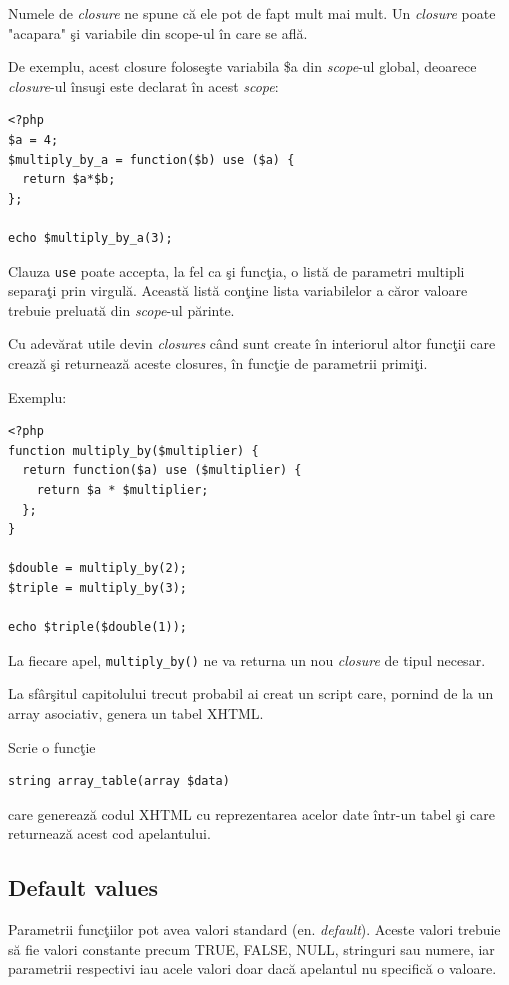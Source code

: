 Numele de \textit{closure} ne spune că ele pot de fapt mult mai mult.
Un \textit{closure} poate "acapara" şi variabile din scope-ul în care se află.

De exemplu, acest closure foloseşte variabila \$a din \textit{scope}-ul global,
deoarece \textit{closure}-ul însuşi este declarat în acest \textit{scope}:
\begin{lstlisting}
<?php
$a = 4;
$multiply_by_a = function($b) use ($a) {
  return $a*$b;
};

echo $multiply_by_a(3);
\end{lstlisting}
Clauza \texttt{use} poate accepta,
la fel ca şi funcţia, o listă de parametri multipli
separaţi prin virgulă. Această listă conţine lista variabilelor
a căror valoare trebuie preluată din \textit{scope}-ul părinte.

Cu adevărat utile devin \textit{closures} când sunt 
create în interiorul altor funcţii care crează şi
returnează aceste closures, în funcţie de parametrii primiţi.

Exemplu:
\begin{lstlisting}
<?php
function multiply_by($multiplier) {
  return function($a) use ($multiplier) {
	return $a * $multiplier;
  };
}

$double = multiply_by(2);
$triple = multiply_by(3);

echo $triple($double(1));
\end{lstlisting}
La fiecare apel, \texttt{multiply\_by()} ne va returna
un nou \textit{closure} de tipul necesar.

\begin{Exercise}[title={Afişarea unui array bidimensional}]
La sfârşitul capitolului trecut probabil ai creat un script
care, pornind de la un array asociativ, genera un tabel XHTML.

Scrie o funcţie
\begin{verbatim}
string array_table(array $data)
\end{verbatim}
care generează codul XHTML cu reprezentarea acelor date într-un tabel
şi care returnează acest cod apelantului.
\end{Exercise}

\subsection{Default values}
Parametrii funcţiilor pot avea valori standard (en. \textsl{default}).
Aceste valori trebuie să fie valori constante precum TRUE, FALSE, NULL,
stringuri sau numere, iar parametrii respectivi iau acele valori doar
dacă apelantul nu specifică o valoare.


